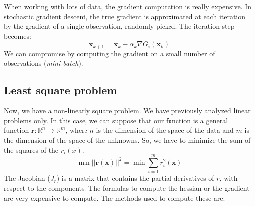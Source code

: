 \documentclass[11pt]{article}
\begin{document}
When working with lots of data, the gradient computation is really expensive. In stochastic gradient descent, the true gradient is approximated at each iteration by the gradient of a single observation, randomly picked. The iteration step becomes:
\begin{displaymath}
    \mathbf{x}_{k+1}=\mathbf{x}_{k}-\alpha_{k} \nabla G_{i}\left(\mathbf{x}_{k}\right)
\end{displaymath}
We can compromise by computing the gradient on a small number of observations (\textit{mini-batch}).
\subsection{Least square problem}
Now, we have a non-linearly square problem. We have previously analyzed linear problems only. In this case, we can suppose that our function is a general function $\mathbf{r}: \mathbb{R}^{n} \rightarrow \mathbb{R}^{m}$, where $n$ is the dimension of the space of the data and $m$ is the dimension of the space of the unknowns. So, we have to minimize the sum of the squares of the $r_i(x)$.
\begin{displaymath}
    \min || \mathbf{r}(\mathbf{x})||^{2}=\min \sum_{i=1}^{m} r_{i}^{2}(\mathbf{x})
\end{displaymath}
The Jacobian ($J_r$) is a matrix that contains the partial derivatives of $r$, with respect to the components. 
The formulas to compute the hessian or the gradient are very expensive to compute. The methods used to compute these are:
\end{document}
